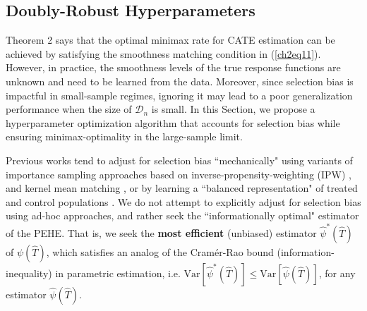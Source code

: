 \documentclass [PhD] {uclathes}
\begin{document}
\subsection{Doubly-Robust Hyperparameters}
\label{modsec}
Theorem 2 says that the optimal minimax rate for CATE estimation can be achieved by satisfying the smoothness matching condition in (\ref{ch2eq11}). However, in practice, the smoothness levels of the true response functions are unknown and need to be learned from the data. Moreover, since selection bias is impactful in small-sample regimes, ignoring it may lead to a poor generalization performance when the size of $\mathcal{D}_n$ is small. In this Section, we propose a hyperparameter optimization algorithm that accounts for selection bias while ensuring minimax-optimality in the large-sample limit.

Previous works tend to adjust for selection bias ``mechanically" using variants of importance sampling approaches based on inverse-propensity-weighting (IPW) \cite{sugiyama2007covariate,shimodaira2000improving}, and kernel mean matching \cite{huang2007correcting}, or by learning a ``balanced representation" of treated and control populations \cite{li2017matching}. We do not attempt to explicitly adjust for selection bias using ad-hoc approaches, and rather seek the ``informationally optimal" estimator of the PEHE. That is, we seek the \textbf{most efficient} (unbiased) estimator $\hat{\psi}^{*}(\hat{T})$ of $\psi(\hat{T})$, which satisfies an analog of the Cram\'er-Rao bound (information-inequality) in parametric estimation, i.e. $\mbox{Var}[\hat{\psi}^{*}(\hat{T})] \leq \mbox{Var}[\hat{\psi}(\hat{T})]$, for any estimator $\hat{\psi}(\hat{T})$. 
\end{document}
